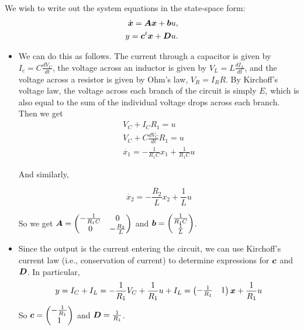 We wish to write out the system equations in the state-space form:
\begin{eqnarray*}
    \dot{\boldsymbol{x}}=\boldsymbol{A}\boldsymbol{x}+\boldsymbol{b}u,\\y=\boldsymbol{c}^{t}\boldsymbol{x}+\boldsymbol{D}u.
\end{eqnarray*}
\begin{itemize}
    \item We can do this as follows.  The current through a capacitor is
          given by \(I_{c}=C\frac{dV_{C}}{dt}\), the voltage across an inductor is
          given by \(V_{L}=L\frac{dI_{L}}{dt}\), and the voltage across a resistor is
          given by Ohm's law, \(V_{R}=I_{R}R\).  By Kirchoff's voltage law, the voltage
          across each branch of the circuit is simply \(E\), which is also equal to the sum of the individual voltage drops across each branch. Then we get
          \begin{gather*}
              V_C + I_CR_1              = u \\
              V_C + C\frac{dV_C}{dt}R_1 = u \\
              \dot{x_1}                 = -\frac{1}{R_1C}x_1 + \frac{1}{R_1C}u
          \end{gather*}

          And similarly,

          \[ \dot{x_2} = -\frac{R_2}{L}x_2 + \frac{1}{L}u \]


          So we get \( \boldsymbol{A} = \begin{pmatrix}
              -\frac{1}{R_1C} & 0              \\
              0               & -\frac{R_2}{L}
          \end{pmatrix} \) and \( \boldsymbol{b} = \begin{pmatrix}
              \frac{1}{R_1C} \\ \frac{1}{L}
          \end{pmatrix} \).

    \item Since the output is the current entering the circuit, we can
          use Kirchoff's current law (i.e., conservation of current) to determine
          expressions for \(\boldsymbol{c}\) and \(\boldsymbol{D}\). In particular,
          \[ y = I_C + I_L = -\frac{1}{R_1}V_C + \frac{1}{R_1}u + I_L = \begin{pmatrix}
                  -\frac{1}{R_1} & 1
              \end{pmatrix}\boldsymbol{x} + \frac{1}{R_1}u \]
          So \( \boldsymbol{c} = \begin{pmatrix}
              -\frac{1}{R_1} \\
              1
          \end{pmatrix} \) and \( \boldsymbol{D} = \frac{1}{R_1} \).
\end{itemize}

